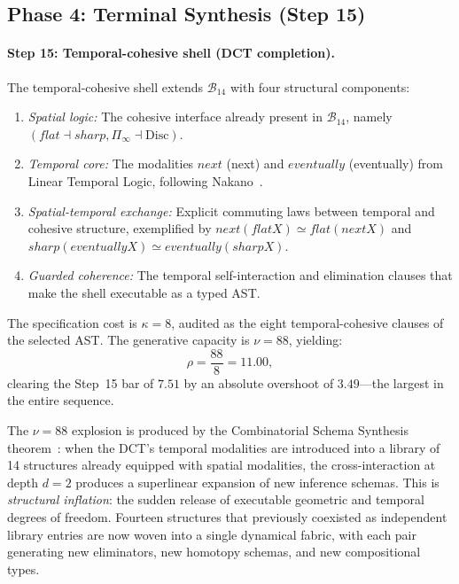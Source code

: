 \documentclass[11pt,a4paper]{article}
\def\flat{flat}%
\def\sharp{sharp}%
\def\bigcirc{next}%
\def\Diamond{eventually}%
\theoremstyle{plain}
\theoremstyle{definition}
\theoremstyle{remark}
\newcommand{\Disc}{\mathrm{Disc}}
\newcommand{\B}{\mathcal{B}}
\begin{document}
\subsection{Phase 4: Terminal Synthesis (Step 15)}
\label{sec:terminal}

\paragraph{Step 15: Temporal-cohesive shell (DCT completion).}  The temporal-cohesive shell extends $\B_{14}$ with four structural components:

\begin{enumerate}[nosep]
    \item \emph{Spatial logic:} The cohesive interface already present in $\B_{14}$, namely $(\flat \dashv \sharp, \Pi_{\!\infty} \dashv \Disc)$.
    \item \emph{Temporal core:} The modalities $\bigcirc$ (next) and $\Diamond$ (eventually) from Linear Temporal Logic, following Nakano~\cite{nakano2000}.
    \item \emph{Spatial-temporal exchange:} Explicit commuting laws between temporal and cohesive structure, exemplified by $\bigcirc(\flat X) \simeq \flat(\bigcirc X)$ and $\sharp(\Diamond X) \simeq \Diamond(\sharp X)$.
    \item \emph{Guarded coherence:} The temporal self-interaction and elimination clauses that make the shell executable as a typed AST.
\end{enumerate}

The specification cost is $\kappa = 8$, audited as the eight temporal-cohesive clauses of the selected AST.  The generative capacity is $\nu = 88$, yielding:
\begin{equation}
\label{eq:step15}
\rho = \frac{88}{8} = 11.00,
\end{equation}
clearing the Step~15 bar of $7.51$ by an absolute overshoot of $3.49$---the largest in the entire sequence.

The $\nu = 88$ explosion is produced by the Combinatorial Schema Synthesis theorem~\cite{pen2026}: when the DCT's temporal modalities are introduced into a library of 14 structures already equipped with spatial modalities, the cross-interaction at depth $d = 2$ produces a superlinear expansion of new inference schemas.  This is \emph{structural inflation}: the sudden release of executable geometric and temporal degrees of freedom.  Fourteen structures that previously coexisted as independent library entries are now woven into a single dynamical fabric, with each pair generating new eliminators, new homotopy schemas, and new compositional types.
\end{document}
